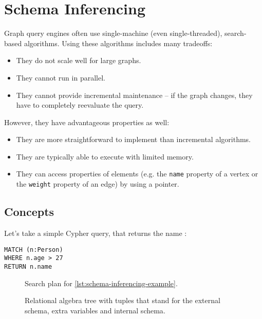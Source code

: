 \chapter{Schema Inferencing}

Graph query engines often use single-machine (even single-threaded), search-based algorithms. Using these algorithms includes many tradeoffs:

\begin{itemize}
	\item They do not scale well for large graphs.
	\item They cannot run in parallel.
	\item They cannot provide incremental maintenance -- if the graph changes, they have to completely reevaluate the query.
\end{itemize}

However, they have advantageous properties as well:

\begin{itemize}
	\item They are more straightforward to implement than incremental algorithms.
	\item They are typically able to execute with limited memory.
	\item They can access properties of elements (e.g. the \texttt{name} property of a vertex or the \texttt{weight} property of an edge) by using a pointer.
\end{itemize}

\section{Concepts}

Let's take a simple Cypher query, that returns the name :

\begin{lstlisting}[label=lst:schema-inferencing-example, caption=Example query]
MATCH (n:Person)
WHERE n.age > 27
RETURN n.name
\end{lstlisting}

\newcommand{\screenshotscale}{0.45}

\begin{figure}
	\centering
	
	\caption{Search plan for \autoref{lst:schema-inferencing-example}.}
	\label{fig:neo4-query-plan}
\end{figure}

\begin{figure}
	\centering
	
	\caption{Relational algebra tree with tuples that stand for the \textcolor{externalschemacolor}{external schema}, \textcolor{extravariablescolor}{extra variables} and \textcolor{internalschemacolor}{internal schema}.}
	\label{fig:example-schema-inferencing}
\end{figure}

